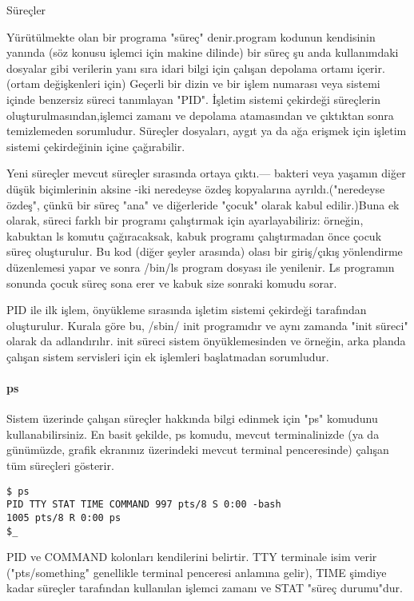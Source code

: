 \begin{section}{Süreçler}

Yürütülmekte olan bir programa "süreç" denir.program kodunun kendisinin yanında (söz konusu işlemci için makine dilinde) bir süreç şu anda kullanımdaki dosyalar gibi verilerin yanı sıra idari bilgi için çalışan depolama ortamı içerir. (ortam değişkenleri için) Geçerli bir dizin ve bir işlem numarası veya sistemi içinde benzersiz süreci tanımlayan "PID". İşletim sistemi çekirdeği süreçlerin oluşturulmasından,işlemci zamanı ve  depolama atamasından ve çıktıktan sonra temizlemeden sorumludur. Süreçler dosyaları, aygıt ya da ağa erişmek için işletim sistemi çekirdeğinin içine çağırabilir.

Yeni süreçler mevcut süreçler sırasında ortaya çıktı.— bakteri veya yaşamın diğer düşük biçimlerinin aksine -iki neredeyse özdeş kopyalarına ayrıldı.("neredeyse özdeş", çünkü bir süreç "ana" ve diğerleride "çocuk" olarak kabul edilir.)Buna ek olarak, süreci farklı bir programı çalıştırmak için ayarlayabiliriz: örneğin, kabuktan ls komutu çağıracaksak, kabuk programı çalıştırmadan önce çocuk süreç oluşturulur. Bu kod (diğer şeyler arasında) olası bir giriş/çıkış yönlendirme düzenlemesi yapar ve sonra /bin/ls program dosyası ile yenilenir. Ls programın sonunda çocuk süreç sona erer ve kabuk size sonraki komudu sorar.

PID ile ilk işlem, önyükleme sırasında işletim sistemi çekirdeği tarafından oluşturulur. Kurala göre bu, /sbin/ init  programıdır ve aynı zamanda "init süreci" olarak da adlandırılır. init süreci sistem önyüklemesinden ve örneğin, arka planda çalışan sistem servisleri için ek işlemleri başlatmadan sorumludur.

\paragraph{ps}{Sistem üzerinde çalışan süreçler hakkında bilgi edinmek için "ps" komudunu kullanabilirsiniz. En basit şekilde, ps komudu, mevcut terminalinizde (ya da günümüzde, grafik ekranınız üzerindeki mevcut terminal penceresinde) çalışan tüm süreçleri gösterir.}

\begin{verbatim}
$ ps
PID TTY STAT TIME COMMAND 997 pts/8 S 0:00 -bash
1005 pts/8 R 0:00 ps 
$_
\end{verbatim}

PID ve COMMAND kolonları kendilerini belirtir. TTY terminale isim verir ("pts/something" genellikle terminal penceresi anlamına gelir), TIME şimdiye kadar süreçler tarafından kullanılan işlemci zamanı  ve STAT "süreç durumu"dur. 


\end{section}
